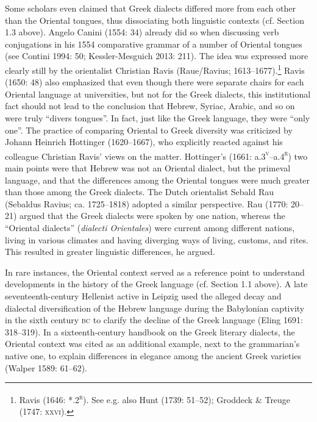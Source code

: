\documentclass[12pt]{article}
\newenvironment{styleStandard}{\renewcommand\baselinestretch{1.25}\setlength\leftskip{0in}\setlength\rightskip{0in}\setlength\parindent{0.1972in}\setlength\parfillskip{0pt plus 1fil}\setlength\parskip{0in plus 1pt}\writerlistparindent\writerlistleftskip\leavevmode\normalfont\normalsize\writerlistlabel\ignorespaces}{\unskip\vspace{0in plus 1pt}\par}
\newcommand\writerlistleftskip{}
\newcommand\writerlistparindent{}
\newcommand\writerlistlabel{}
\begin{document}
\begin{styleStandard}
Some scholars even claimed that Greek dialects differed more from each other than the Oriental tongues, thus dissociating both linguistic contexts (cf. Section 1.3 above). Angelo Canini (1554: 34) already did so when discussing verb conjugations in his 1554 comparative grammar of a number of Oriental tongues (see Contini 1994: 50; Kessler-Mesguich 2013: 211). The idea was expressed more clearly still by the orientalist Christian Ravis (Raue/Ravius; 1613–1677).\footnote{ Ravis (1646: *.2\textsc{\textsuperscript{r}}). See e.g. also Hunt (1739: 51–52); Groddeck \& Treuge (1747: \textsc{xxvi}).} Ravis (1650: 48) also emphasized that even though there were separate chairs for each Oriental language at universities, but not for the Greek dialects, this institutional fact should not lead to the conclusion that Hebrew, Syriac, Arabic, and so on were truly “divers tongues”. In fact, just like the Greek language, they were “only one”. The practice of comparing Oriental to Greek diversity was criticized by Johann Heinrich Hottinger (1620–1667), who explicitly reacted against his colleague Christian Ravis’ views on the matter. Hottinger’s (1661: a.3\textsc{\textsuperscript{v}}–a.4\textsc{\textsuperscript{r}}) two main points were that Hebrew was not an Oriental dialect, but the primeval language, and that the differences among the Oriental tongues were much greater than those among the Greek dialects. The Dutch orientalist Sebald Rau (Sebaldus Ravius; ca. 1725–1818) adopted a similar perspective. Rau (1770: 20–21) argued that the Greek dialects were spoken by one nation, whereas the “Oriental dialects” (\textit{dialecti Orientales}) were current among different nations, living in various climates and having diverging ways of living, customs, and rites. This resulted in greater linguistic differences, he argued.
\end{styleStandard}

\begin{styleStandard}
In rare instances, the Oriental context served as a reference point to understand developments in the history of the Greek language (cf. Section 1.1 above). A late seventeenth-century Hellenist active in Leipzig used the alleged decay and dialectal diversification of the Hebrew language during the Babylonian captivity in the sixth century \textsc{bc} to clarify the decline of the Greek language (Eling 1691: 318–319). In a sixteenth-century handbook on the Greek literary dialects, the Oriental context was cited as an additional example, next to the grammarian’s native one, to explain differences in elegance among the ancient Greek varieties (Walper 1589: 61–62).
\end{styleStandard}
\end{document}

